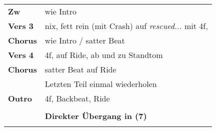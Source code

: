 \begin{tabular}{p{1.6cm}l}
	\textbf{Zw}     & wie Intro                                                                  \\
	\textbf{Vers 3} & nix, fett rein (mit Crash) auf \textit{rescued...} mit 4f,                 \\
	\textbf{Chorus} & wie Intro / satter Beat                                                    \\
	\textbf{Vers 4} & 4f, auf Ride, ab und zu Standtom                                           \\
	\textbf{Chorus} & satter Beat auf Ride                                                       \\
	                & Letzten Teil einmal wiederholen                                            \\
	\textbf{Outro}  & 4f, Backbeat, Ride                                                         \\
	                &                                                                            \\
	                & \textbf{Direkter Übergang in (7)}                                          \\
	                &                                                                            \\
\end{tabular}